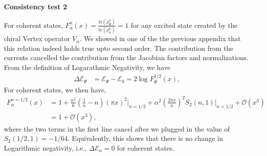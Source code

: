 \documentclass[11pt]{article}
\newcommand{\mO}{\mathcal{O}}
\newcommand{\lb}{\left(}
\newcommand{\rb}{\right)}
\begin{document}
\textbf{Consistency test 2}

For coherent states, $F_{\alpha}^n(x) = \frac{\text{tr}(\rho_\Psi^n)}{\text{tr}(\rho_0^n)} = 1$ for any excited state created by the chiral Vertex operator $V_\alpha$. We showed in one of the the previous appendix that this relation indeed holds true upto second order. The contribution from the currents cancelled the contribution from the Jacobian factors and normalizations. From the definition of Logarathmic Negativity, we have
\begin{align}
    \Delta \mathcal{E}_\Psi &= \mathcal{E}_\Psi - \mathcal{E}_0 = 2\log F_\Psi^{1/2}(x),
\end{align}
For coherent states, we then have,
\begin{align}
    F_\alpha^{n=1/2}(x) &= 1+ \frac{\alpha^2}{6}\lb \frac{1}{n}-n \rb \lb \pi x\rb^2\Bigg|_{n=1/2} + \alpha^2 \lb \frac{2\pi x}{n}\rb^2 S_2(n,1) \Bigg|_{n=1/2} + \mO(x^3) \\
    &=1+ \mO(x^3),
\end{align}
where the two terms in the first line cancel after we plugged in the value of $S_2(1/2,1) = -1/64$. Equivalently, this shows that there is no change in Logarithmic negativity, i.e., $\Delta \mathcal{E}_\alpha=0$ for coherent states. 
\end{document}
